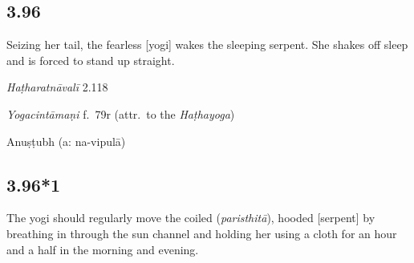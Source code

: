 \begin{ekdosis}
\subsection*{3.96}
\begin{translation}[hp03_096]
Seizing her tail, the fearless [yogi] wakes the sleeping serpent.  She shakes off sleep and is forced to stand up straight.
\end{translation}


\begin{testimonia}[hp03_096]
\emph{Haṭharatnāvalī} 2.118
\begin{versinnote}
\end{versinnote}

\emph{Yogacintāmaṇi} f.~79r (attr.~to the \emph{Haṭhayoga})
\begin{versinnote}
\end{versinnote}

\end{testimonia}


\begin{metre}[hp03_096]
Anuṣṭubh (a: na-vipulā)
\end{metre}

\subsection*{3.96*1}
\begin{translation}[hp03_096_1]
The yogi should regularly move the coiled (\emph{paristhitā}), hooded [serpent] by breathing in through the sun channel and holding her using a cloth for an hour and a half in the morning and evening.
\end{translation}



\end{ekdosis}
